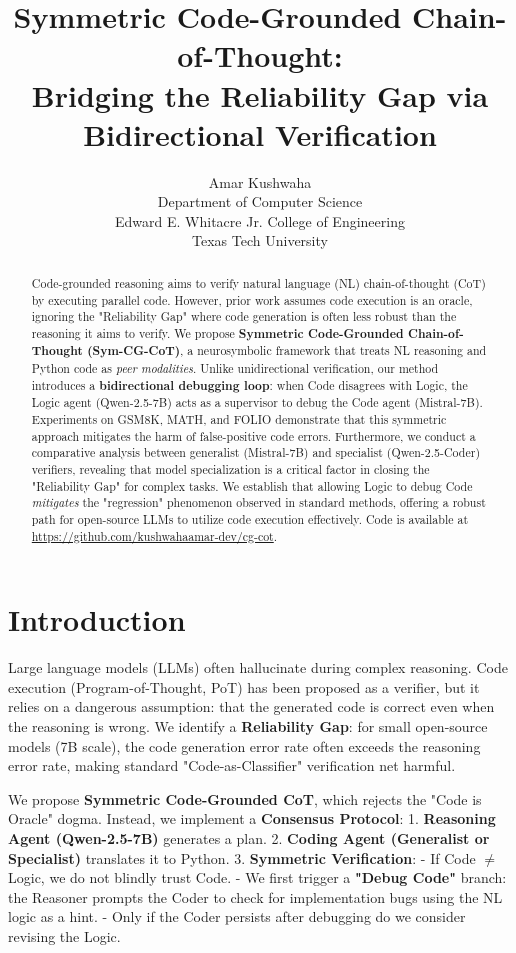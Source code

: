 \documentclass[11pt]{article}
\title{Symmetric Code-Grounded Chain-of-Thought: \\
Bridging the Reliability Gap via Bidirectional Verification}
\author{Amar Kushwaha \\
  Department of Computer Science \\
  Edward E. Whitacre Jr. College of Engineering \\
  Texas Tech University}
\begin{document}
\maketitle

\begin{abstract}
Code-grounded reasoning aims to verify natural language (NL) chain-of-thought (CoT) by executing parallel code. However, prior work assumes code execution is an oracle, ignoring the "Reliability Gap" where code generation is often less robust than the reasoning it aims to verify.
We propose \textbf{Symmetric Code-Grounded Chain-of-Thought (Sym-CG-CoT)}, a neurosymbolic framework that treats NL reasoning and Python code as \emph{peer modalities}. Unlike unidirectional verification, our method introduces a \textbf{bidirectional debugging loop}: when Code disagrees with Logic, the Logic agent (Qwen-2.5-7B) acts as a supervisor to debug the Code agent (Mistral-7B). 
Experiments on GSM8K, MATH, and FOLIO demonstrate that this symmetric approach mitigates the harm of false-positive code errors. Furthermore, we conduct a comparative analysis between generalist (Mistral-7B) and specialist (Qwen-2.5-Coder) verifiers, revealing that model specialization is a critical factor in closing the "Reliability Gap" for complex tasks. We establish that allowing Logic to debug Code \emph{mitigates} the "regression" phenomenon observed in standard methods, offering a robust path for open-source LLMs to utilize code execution effectively. Code is available at \url{https://github.com/kushwahaamar-dev/cg-cot}.
\end{abstract}

\section{Introduction}
\label{sec:intro}

Large language models (LLMs) often hallucinate during complex reasoning. Code execution (Program-of-Thought, PoT) has been proposed as a verifier, but it relies on a dangerous assumption: that the generated code is correct even when the reasoning is wrong.
We identify a \textbf{Reliability Gap}: for small open-source models (7B scale), the code generation error rate often exceeds the reasoning error rate, making standard "Code-as-Classifier" verification net harmful.

We propose \textbf{Symmetric Code-Grounded CoT}, which rejects the "Code is Oracle" dogma. Instead, we implement a \textbf{Consensus Protocol}:
1. \textbf{Reasoning Agent (Qwen-2.5-7B)} generates a plan.
2. \textbf{Coding Agent (Generalist or Specialist)} translates it to Python.
3. \textbf{Symmetric Verification}:
   - If Code $\neq$ Logic, we do not blindly trust Code.
   - We first trigger a \textbf{"Debug Code"} branch: the Reasoner prompts the Coder to check for implementation bugs using the NL logic as a hint.
   - Only if the Coder persists after debugging do we consider revising the Logic.
\end{document}
